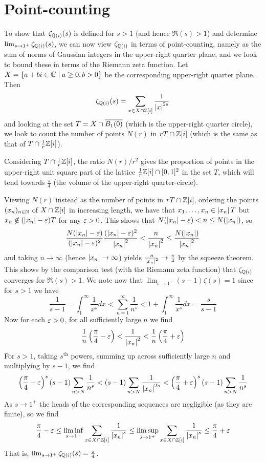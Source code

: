 \documentclass[11pt]{article}
\begin{document}
\section{Point-counting}
To show that $\zeta_{\mathbb{Q}(i)}(s)$ is defined for $s > 1$ (and hence $\Re(s) > 1$) and determine $\lim_{s \to 1^+}\zeta_{\mathbb{Q}(i)}(s)$, we can now view $\zeta_{\mathbb{Q}(i)}$ in terms of point-counting, namely as the sum of norms of Gaussian integers in the upper-right quarter plane, and we look to bound these in terms of the Riemann zeta function. Let $X = \left\{  a + bi \in \mathbb{C} \mid a \geq 0, b > 0  \right\}$ be the corresponding upper-right quarter plane. Then 
$$
    \zeta_{\mathbb{Q}(i)}(s) = \sum_{x \in X \cap \mathbb{Z}[i]} \frac1{\left| x \right|^{2s}}
$$
and looking at the set $T = X \cap \overline{B_1(0)}$ (which is the upper-right quarter circle), we look to count the number of points $N(r)$ in $rT \cap \mathbb{Z}[i]$ (which is the same as that of $T \cap \frac1r\mathbb{Z}[i]$).

Considering $T \cap \frac1r\mathbb{Z}[i]$, the ratio $N(r)/r^2$ gives the proportion of points in the upper-right unit square part of the lattice $\frac1r\mathbb{Z}[i] \cap [0, 1]^2$ in the set $T$, which will tend towards $\frac\pi4$ (the volume of the upper-right quarter-circle). 

Viewing $N(r)$ instead as the number of points in $rT \cap \mathbb{Z}[i]$, ordering the points $(x_n)_{n \in \mathbb{N}}$ of $X \cap \mathbb{Z}[i]$ in increasing length, we have that $x_1, \ldots, x_n \in \left| x_n \right|T$ but $x_n \not\in (\left| x_n \right| - \varepsilon)T$ for any $\varepsilon > 0$. This shows that $N(\left| x_n \right| - \varepsilon) < n \leq N(\left| x_n \right|)$, so
$$
    \frac{N(\left| x_n \right| - \varepsilon)}{(\left| x_n \right| - \varepsilon)^2}\frac{(\left| x_n \right| - \varepsilon)^2}{\left| x_n \right|^2} < \frac n{\left| x_n \right|^2} \leq \frac{N(\left| x_n \right|)}{\left| x_n \right|^2}
$$
and taking $n \to \infty$ (hence $\left| x_n \right| \to \infty$) yields $\frac{n}{\left| x_n \right|^2} \to \frac\pi4$ by the squeeze theorem. This shows by the comparison test (with the Riemann zeta function) that $\zeta_{\mathbb{Q}(i)}$ converges for $\Re(s) > 1$. We note now that $\lim_{s \to 1^+} (s - 1)\zeta(s) = 1$ since for $s > 1$ we have
$$
    \frac1{s - 1} = \int_1^\infty \frac1{x^s}dx < \sum_{n = 1}^\infty \frac1{n^s} < 1 + \int_1^\infty \frac1{x^s}dx = \frac s{s - 1}
$$
Now for each $\varepsilon > 0$, for all sufficiently large $n$ we find 
$$
    \frac1n\left(  \frac\pi4 - \varepsilon  \right) < \frac1{\left| x_n \right|^2} < \frac1n\left(  \frac\pi4 + \varepsilon  \right)
$$
For $s > 1$, taking $s^{\text{th}}$ powers, summing up across sufficiently large $n$ and multiplying by $s - 1$, we find
$$
    \left(  \frac\pi4 - \varepsilon  \right)^s(s - 1)\sum_{n > N}\frac1{n^s} < (s - 1)\sum_{n > N}\frac1{\left| x_n \right|^{2s}} < \left(  \frac\pi4 + \varepsilon  \right)^s(s - 1)\sum_{n > N}\frac1{n^s}
$$
As $s \to 1^+$ the heads of the corresponding sequences are negligible (as they are finite), so we find
$$
    \frac\pi4 - \varepsilon \leq \liminf_{s \to 1^+}\sum_{x \in X \cap \mathbb{Z}[i]}\frac1{\left| x_n \right|^s} \leq \limsup_{s \to 1^+}\sum_{x \in X \cap \mathbb{Z}[i]}\frac1{\left| x_n \right|^s} \leq \frac\pi4 + \varepsilon
$$
That is, $\lim_{s \to 1^+} \zeta_{\mathbb{Q}(i)}(s) = \frac\pi4$.
\end{document}
